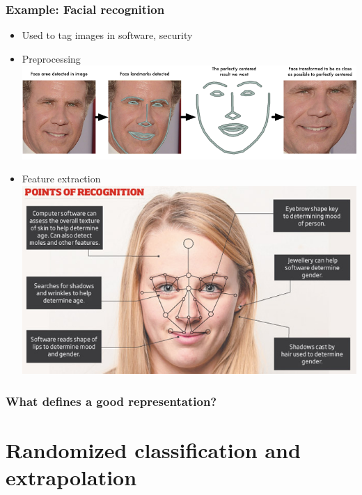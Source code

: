 \documentclass{beamer}
\begin{document}
\begin{frame}
\frametitle{Example: Facial recognition}
\begin{itemize}
\item Used to tag images in software, security \pause
\item Preprocessing
\includegraphics[scale = 0.4]{face_alignment.png}
\pause
\item Feature extraction
\includegraphics[scale = 0.4]{facerec_features.jpg}
\end{itemize}
\end{frame}

\begin{frame}
\frametitle{What defines a good representation?}

\end{frame}


\section{Randomized classification and extrapolation}

\begin{frame}
\sectionpage
\end{frame}
\end{document}
